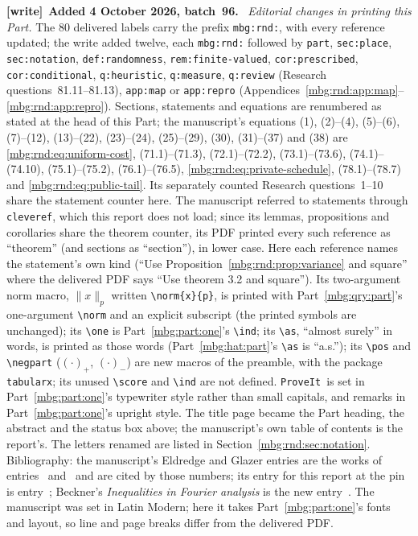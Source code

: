 \documentclass[11pt,letterpaper]{article}
\theoremstyle{definition}
\newcommand{\repo}{\texttt{ProveIt}}
\newenvironment{writenote}[1][]{\par\smallskip\begingroup\small
 \noindent\textbf{[write]}\if\relax\detokenize{#1}\relax\else~\textbf{#1.}\fi\ }%
 {\par\endgroup\smallskip}
\begin{document}
\begin{writenote}[Added 4 October 2026, batch~96]
\emph{Editorial changes in printing this Part.} The 80 delivered labels carry the prefix \texttt{mbg:rnd:}, with every reference updated; the write added twelve, each \texttt{mbg:rnd:} followed by \texttt{part}, \texttt{sec:place}, \texttt{sec:notation}, \texttt{def:randomness}, \texttt{rem:finite-valued}, \texttt{cor:prescribed}, \texttt{cor:conditional}, \texttt{q:heuristic}, \texttt{q:measure}, \texttt{q:review} (Research questions~81.11--81.13), \texttt{app:map} or \texttt{app:repro} (Appendices~\ref{mbg:rnd:app:map}--\ref{mbg:rnd:app:repro}). Sections, statements and equations are renumbered as stated at the head of this Part; the manuscript's equations (1), (2)--(4), (5)--(6), (7)--(12), (13)--(22), (23)--(24), (25)--(29), (30), (31)--(37) and (38) are \eqref{mbg:rnd:eq:uniform-cost}, (71.1)--(71.3), (72.1)--(72.2), (73.1)--(73.6), (74.1)--(74.10), (75.1)--(75.2), (76.1)--(76.5), \eqref{mbg:rnd:eq:private-schedule}, (78.1)--(78.7) and \eqref{mbg:rnd:eq:public-tail}. Its separately counted Research questions~1--10 share the statement counter here. The manuscript referred to statements through \texttt{cleveref}, which this report does not load; since its lemmas, propositions and corollaries share the theorem counter, its PDF printed every such reference as ``theorem'' (and sections as ``section''), in lower case. Here each reference names the statement's own kind (``Use Proposition~\ref{mbg:rnd:prop:variance} and square'' where the delivered PDF says ``Use theorem 3.2 and square''). Its two-argument norm macro, $\lVert x\rVert_p$ written \texttt{\textbackslash norm\{x\}\{p\}}, is printed with Part~\ref{mbg:qry:part}'s one-argument \texttt{\textbackslash norm} and an explicit subscript (the printed symbols are unchanged); its \texttt{\textbackslash one} is Part~\ref{mbg:part:one}'s \texttt{\textbackslash ind}; its \texttt{\textbackslash as}, ``almost surely'' in words, is printed as those words (Part~\ref{mbg:hat:part}'s \texttt{\textbackslash as} is ``a.s.''); its \texttt{\textbackslash pos} and \texttt{\textbackslash negpart} ($(\cdot)_+$, $(\cdot)_-$) are new macros of the preamble, with the package \texttt{tabularx}; its unused \texttt{\textbackslash score} and \texttt{\textbackslash ind} are not defined. \repo\ is set in Part~\ref{mbg:part:one}'s typewriter style rather than small capitals, and remarks in Part~\ref{mbg:part:one}'s upright style. The title page became the Part heading, the abstract and the status box above; the manuscript's own table of contents is the report's. The letters renamed are listed in Section~\ref{mbg:rnd:sec:notation}. Bibliography: the manuscript's Eldredge and Glazer entries are the works of entries~\cite{hat:Eldredge} and~\cite{GlazerBox} and are cited by those numbers; its entry for this report at the pin is entry~\cite{rnd:ProveIt}; Beckner's \emph{Inequalities in Fourier analysis} is the new entry~\cite{rnd:Beckner}. The manuscript was set in Latin Modern; here it takes Part~\ref{mbg:part:one}'s fonts and layout, so line and page breaks differ from the delivered PDF.
\end{writenote}
\end{document}
